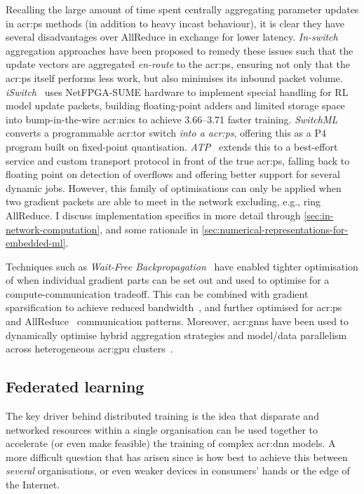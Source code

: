 Recalling the large amount of time spent centrally aggregating parameter updates in \gls{acr:ps} methods (in addition to heavy incast behaviour), it is clear they have several disadvantages over AllReduce in exchange for lower latency.
\emph{In-switch} aggregation approaches have been proposed to remedy these issues such that the update vectors are aggregated \emph{en-route} to the \gls{acr:ps}, ensuring not only that the \gls{acr:ps} itself performs less work, but also minimises its inbound packet volume.
\emph{iSwitch}~\parencite{DBLP:conf/isca/LiLYCSH19} uses NetFPGA-SUME hardware to implement special handling for RL model update packets, building floating-point adders and limited storage space into bump-in-the-wire \glspl{acr:nic} to achieve \qtyrange{3.66}{3.71}{\times} faster training.
\emph{SwitchML}~\parencite{DBLP:conf/nsdi/SapioC0NKKKMPR21} converts a programmable \gls{acr:tor} switch \emph{into a \gls{acr:ps}}, offering this as a P4 program built on fixed-point quantisation.
\emph{ATP}~\parencite{DBLP:conf/nsdi/LaoLMCWAS21} extends this to a best-effort service and custom transport protocol in front of the true \gls{acr:ps}, falling back to floating point on detection of overflows and offering better support for several dynamic jobs.
However, this family of optimisations can only be applied when two gradient packets are able to meet in the network excluding, e.g., ring AllReduce.
I discuss implementation specifics in more detail through \cref{sec:in-network-computation}, and some rationale in \cref{sec:numerical-representations-for-embedded-ml}.

Techniques such as \emph{Wait-Free Backpropagation}~\parencite{DBLP:conf/usenix/ZhangZXDHLHWXX17,DBLP:conf/ppopp/AwanHHP17} have enabled tighter optimisation of when individual gradient parts can be set out and used to optimise for a compute-communication tradeoff.
This can be combined with gradient sparsification to achieve reduced bandwidth~\parencite{DBLP:conf/infocom/ShiWCLQLZ20}, and further optimised for \gls{acr:ps}~\parencite{DBLP:conf/infocom/WangLG20} and AllReduce~\parencite{DBLP:conf/infocom/BaoPCW20} communication patterns.
Moreover, \glspl{acr:gnn} have been used to dynamically optimise hybrid aggregation strategies and model/data parallelism across heterogeneous \gls{acr:gpu} clusters~\parencite{DBLP:conf/conext/0001ZLLDWZYL20}.

\subsection{Federated learning}
The key driver behind distributed training is the idea that disparate and networked resources within a single organisation can be used together to accelerate (or even make feasible) the training of complex \gls{acr:dnn} models.
A more difficult question that has arisen since is how best to achieve this between \emph{several} organisations, or even weaker devices in consumers' hands or the edge of the Internet.


